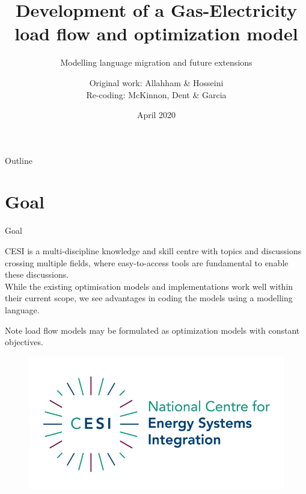 \documentclass[handout]{beamer}
\title[Development of a Coordinated Gas-Electricity optimisation model]{\normalsize{Development of a Gas-Electricity load flow and optimization model}}
\subtitle{\small{Modelling language migration and future extensions}}
\author{\texorpdfstring{Original work: }{}Allahham \& Hosseini \texorpdfstring{\\Re-coding: }{}McKinnon, Dent \& Garcia}
\institute{National Centre for Energy System Integration (CESI)}
\date{\nth{9} April 2020}
\begin{document}
\begin{frame}
  \titlepage
\end{frame}

\begin{frame}{Outline}
  \tableofcontents
\end{frame}


\section{Goal}

\begin{frame}[t]{Goal}

  CESI is a multi-discipline knowledge and skill centre with topics and discussions crossing multiple fields, where easy-to-access tools are fundamental to enable these discussions.\\[12pt]

  While the existing optimisation models and implementations work well within their current scope, we see advantages in coding the models using a modelling language.
  
  Note load flow models may be formulated as optimization models with constant objectives.

  \begin{figure}
  \begin{center}
  \includegraphics[width=.55\textwidth]{CESI.png}
  \end{center}
  \end{figure}

\end{frame}


\end{document}
